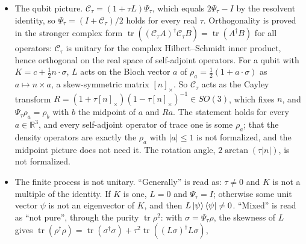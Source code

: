 \documentclass[11pt]{article}
\begin{document}
\begin{itemize}
   derives them too, but not by the brief's route. Each
  $\Psi_\tau$ agrees on density operators with a linear map $T_\tau$, because the density
  operators contain a basis of the operators; $(T_\tau - I)/\tau \to B$ in operator norm, because
  convergence on a basis is norm convergence; and $(T_{t/n})^n \to e^{tB}$ by telescoping. So
  $\Phi_t = e^{tB}$ on density operators for every $t > 0$, which gives affinity, preservation of
  density operators, continuity at $0^+$ and composition for all durations at once; eq.~(28) and
  the common refinements are not needed. DR-PROJ says nothing about $\Phi_0$, which is assumed to
  be the identity:  is DR-UNIT $\Leftrightarrow$ DR-PROJ
  with $\Phi_0 = I$.
\item The qubit picture. $\mathcal{C}_\tau = (1 + \tau L)\Psi_\tau$, which equals
  $2\Psi_\tau - I$ by the resolvent identity, so $\Psi_\tau = (I + \mathcal{C}_\tau)/2$ holds
  for every real $\tau$. Orthogonality is proved in the stronger complex form
  $\operatorname{tr}((\mathcal{C}_\tau A)^\dagger\mathcal{C}_\tau B)
  = \operatorname{tr}(A^\dagger B)$
  for all operators: $\mathcal{C}_\tau$ is unitary for the complex Hilbert--Schmidt inner
  product, hence orthogonal on the real space of self-adjoint operators. For a qubit with
  $K = c + \frac12 n\cdot\sigma$, $L$ acts on the Bloch vector $a$ of
  $\rho_a = \frac12(1 + a\cdot\sigma)$ as $a \mapsto n \times a$, a skew-symmetric matrix
  $[n]_\times$. So $\mathcal{C}_\tau$ acts as the Cayley transform
  $R = (1 + \tau[n]_\times)(1 - \tau[n]_\times)^{-1} \in SO(3)$, which fixes $n$, and
  $\Psi_\tau\rho_a = \rho_b$ with $b$ the midpoint of $a$ and $Ra$. The statement holds for every
  $a \in \mathbb{R}^3$, and every self-adjoint operator of trace one is some $\rho_a$; that the
  density operators are exactly the $\rho_a$ with $|a| \le 1$ is not formalized, and the
  midpoint picture does not need it. The rotation angle, $2\arctan(\tau|n|)$, is not formalized.
\item The finite process is not unitary. ``Generally'' is read as: $\tau \ne 0$ and $K$ is not a
  multiple of the identity. If $K$ is one, $L = 0$ and $\Psi_\tau = I$; otherwise some unit
  vector $\psi$ is not an eigenvector of $K$, and then $L\ket{\psi}\bra{\psi} \ne 0$. ``Mixed''
  is read as ``not pure'', through the purity $\operatorname{tr}\rho^2$: with $\sigma =
  \Psi_\tau\rho$, the skewness of $L$ gives $\operatorname{tr}(\rho^\dagger\rho) =
  \operatorname{tr}(\sigma^\dagger\sigma) + \tau^2\operatorname{tr}((L\sigma)^\dagger L\sigma)$,

\end{itemize}
\end{document}
